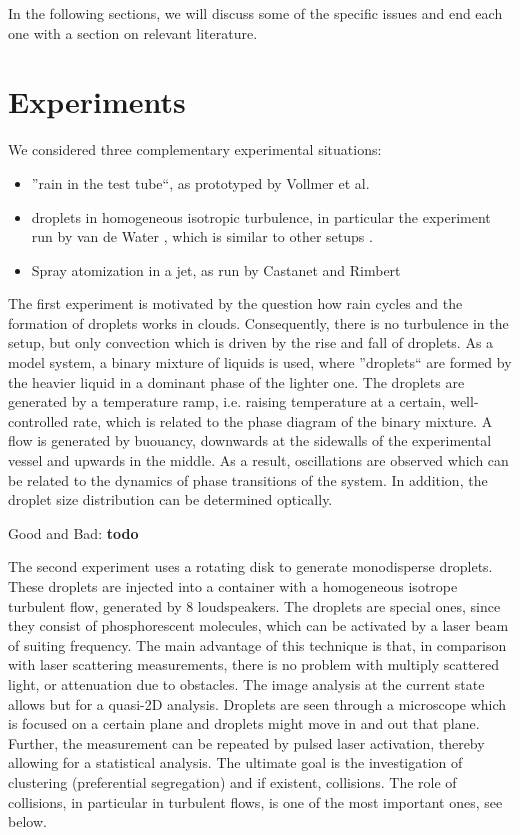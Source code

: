 \documentclass{report}
\begin{document}
In the following sections, we will discuss some of the specific issues
and end each one with a section on relevant literature.

\chapter{Experiments}

We considered three complementary experimental situations:
\begin{itemize}
 \item ''rain in the test tube``, as prototyped by Vollmer et al.\cite{Vollmer}
 \item droplets in homogeneous isotropic turbulence, in particular the experiment
 run by van de Water \cite{vandeWater}, which is similar to other setups \cite{Goettingen,Lyon}.
 \item Spray atomization in a jet, as run by Castanet and Rimbert \cite{Castanet} 
 \end{itemize}

The first experiment is motivated by the question how rain cycles and the formation 
of droplets works in clouds. Consequently, there is no turbulence in the setup, but
only convection which is driven by the rise and fall of droplets. As a model system,
a binary mixture of liquids is used, where ''droplets`` are formed by the heavier liquid 
in a dominant phase of the lighter one. The droplets are generated 
by a temperature ramp, i.e. raising temperature at a certain, well-controlled rate,
which is related to the phase diagram of the binary mixture. A flow is generated 
by buouancy, downwards at the sidewalls of the experimental vessel and upwards
in the middle. As a result, oscillations are observed which can be related
to the dynamics of phase transitions of the system. In addition, the droplet size distribution 
can be determined optically.

Good 
and
Bad:
{\bf \color{red}todo}

The second experiment uses a rotating disk to generate monodisperse droplets.
These droplets are injected into a container with a homogeneous isotrope turbulent
flow, generated by 8 loudspeakers. The droplets are special ones, since they 
consist of phosphorescent molecules, which can be activated by a laser beam
of suiting frequency. The main advantage of this technique is that, in comparison with
 laser scattering measurements, there is
no problem with multiply scattered light, or attenuation due to obstacles.
The image analysis at the current state allows but for a quasi-2D analysis.
Droplets are seen through a microscope which is focused on a certain plane
and droplets might move in and out that plane. Further, the measurement
can be repeated by pulsed laser activation, thereby allowing for a statistical
analysis. The ultimate goal is the investigation of clustering (preferential segregation) and 
if existent, collisions. The role of collisions, in particular in turbulent flows,
is one of the most important ones, see below.
\end{document}
